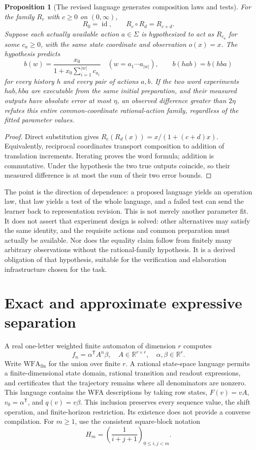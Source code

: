 \documentclass[11pt]{article}
\newtheorem{proposition}[theorem]{Proposition}
\theoremstyle{definition}
\begin{document}
\begin{proposition}[The revised language generates composition laws and tests]
\label{lr:generated-tests}
For the family $R_c$ with $c\geq0$ on $(0,\infty)$,
\[
 R_0=\operatorname{id},\qquad R_c\circ R_d=R_{c+d}.
\]
Suppose each actually available action $a\in\Sigma$ is hypothesized
to act as $R_{c_a}$ for some $c_a\geq0$, with the same state coordinate
and observation $o(x)=x$. The hypothesis predicts
\[
 b(w)=\frac{x_0}{1+x_0\sum_{i=1}^{|w|}c_{a_i}}
 \quad(w=a_1\cdots a_{|w|}),
 \qquad b(hab)=b(hba)
\]
for every history $h$ and every pair of actions $a,b$.
If the two word experiments $hab,hba$ are executable from the same
initial preparation, and their measured outputs have absolute error
at most $\eta$, an observed difference greater than $2\eta$ refutes
this \emph{entire common-coordinate rational-action family}, regardless
of the fitted parameter values.
\end{proposition}
\begin{proof}
Direct substitution gives
$R_c(R_d(x))=x/(1+(c+d)x)$. Equivalently, reciprocal coordinates
transport composition to addition of translation increments. Iterating
proves the word formula; addition is commutative. Under the hypothesis
the two true outputs coincide, so their measured difference is at most
the sum of their two error bounds.
\end{proof}

The point is the direction of dependence: a proposed language yields an
operation law, that law yields a test of the whole language, and a failed
test can send the learner back to representation revision. This is not
merely another parameter fit. It does not assert that experiment design
is solved: other alternatives may satisfy the same identity, and the
requisite actions and common preparation must actually be available.
Nor does the equality claim follow from finitely many arbitrary
observations without the rational-family hypothesis. It is a derived
obligation of that hypothesis, suitable for the verification and
elaboration infrastructure chosen for the task.

\section{Exact and approximate expressive separation}
\label{sec:expressivity}

A real one-letter weighted finite automaton of dimension $r$ computes
\[
 f_n=\alpha^{\mathsf T}A^n\beta,
 \quad A\in\mathbb R^{r\times r},\quad \alpha,\beta\in\mathbb R^r.
\]
Write $\mathrm{WFA}_{\mathrm{fin}}$ for the union over finite $r$.
A rational state-space language permits a finite-dimensional state domain,
rational transition and readout expressions, and certificates that the
trajectory remains where all denominators are nonzero. This language
contains the WFA descriptions by taking row states, $F(v)=vA$, $v_0=\alpha^{\mathsf T}$, and
$q(v)=v\beta$. This inclusion preserves every sequence value,
the shift operation, and finite-horizon restriction. Its existence does not
provide a converse compilation. For $m\geq1$, use the consistent
square-block notation
\[
 H_m=\left(\frac1{i+j+1}\right)_{0\leq i,j<m}.
\]
\end{document}
